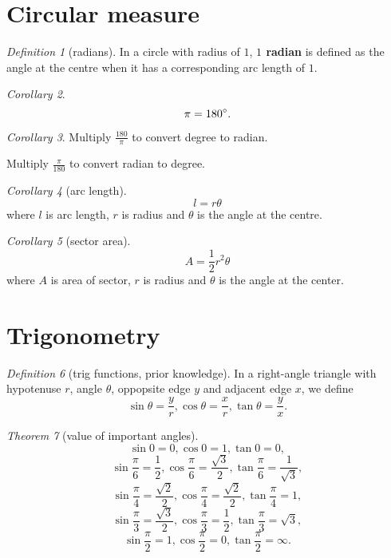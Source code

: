\documentclass[8pt]{article}
\theoremstyle{remark}
\newtheorem{theorem}{Theorem}[section]
\newtheorem{corollary}[theorem]{Corollary}
\newtheorem{definition}[theorem]{Definition}
\begin{document}
    \section{Circular measure}
        \begin{definition}[radians]
            In a circle with radius of $1$, \textbf{$1$ radian} is defined as the angle at the centre when it has a corresponding arc length of $1$.
        \end{definition}

        \begin{corollary}
            $$
                \pi = 180^\circ.
            $$
        \end{corollary}

        \begin{corollary}
            Multiply $\frac{180}{\pi}$ to convert degree to radian.
            
            Multiply $\frac{\pi}{180}$ to convert radian to degree.
        \end{corollary}

        \begin{corollary}[arc length]
            $$l = r \theta$$
            where $l$ is arc length, $r$ is radius and $\theta$ is the angle at the centre.
        \end{corollary}

        \begin{corollary}[sector area]
            $$A = \frac{1}{2} r^2 \theta$$
            where $A$ is area of sector, $r$ is radius and $\theta$ is the angle at the center.
        \end{corollary}

    \section{Trigonometry}
        
        \begin{definition}[trig functions, prior knowledge]
            In a right-angle triangle with hypotenuse $r$, angle $\theta$, oppopsite edge $y$ and adjacent edge $x$, we define
            $$
                \sin \theta = \frac{y}{r}, \cos \theta = \frac{x}{r}, \tan \theta = \frac{y}{x}.
            $$
        \end{definition}

        \begin{theorem}[value of important angles]
            $$\sin 0 = 0, \cos 0 = 1, \tan 0 = 0,$$
            $$\sin \frac{\pi}{6} = \frac{1}{2}, \cos \frac{\pi}{6} = \frac{\sqrt{3}}{2}, \tan \frac{\pi}{6} = \frac{1}{\sqrt{3}},$$
            $$\sin \frac{\pi}{4} = \frac{\sqrt{2}}{2}, \cos \frac{\pi}{4} = \frac{\sqrt{2}}{2}, \tan \frac{\pi}{4} = 1,$$
            $$\sin \frac{\pi}{3} = \frac{\sqrt{3}}{2}, \cos \frac{\pi}{3} = \frac{1}{2}, \tan \frac{\pi}{3} = \sqrt{3},$$
            $$\sin \frac{\pi}{2} = 1, \cos \frac{\pi}{2} = 0, \tan \frac{\pi}{2} = \infty.$$
        \end{theorem}
\end{document}
